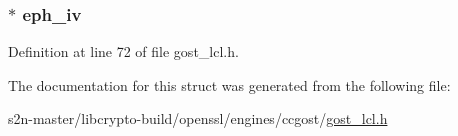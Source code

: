 \subsubsection[{\texorpdfstring{eph\+\_\+iv}{eph_iv}}]{$\ast$ eph\+\_\+iv}\hypertarget{struct_g_o_s_t___k_e_y___a_g_r_e_e_m_e_n_t___i_n_f_o_afad9b0ce8352efbcc49b0af5ad965c62}{}\label{struct_g_o_s_t___k_e_y___a_g_r_e_e_m_e_n_t___i_n_f_o_afad9b0ce8352efbcc49b0af5ad965c62}


Definition at line 72 of file gost\+\_\+lcl.\+h.



The documentation for this struct was generated from the following file\+:\begin{DoxyCompactItemize}
\item 
s2n-\/master/libcrypto-\/build/openssl/engines/ccgost/\hyperlink{gost__lcl_8h}{gost\+\_\+lcl.\+h}\end{DoxyCompactItemize}
